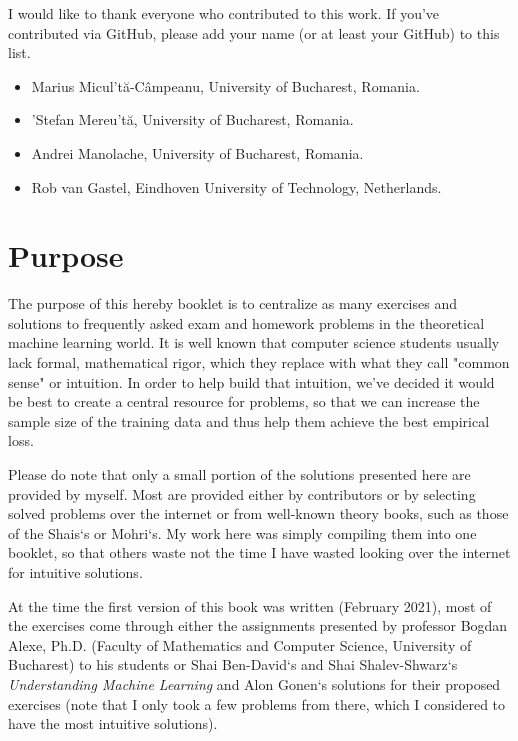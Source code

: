 \documentclass{article}
\newcommand{\<}{\langle}
\renewcommand{\>}{\rangle}
\theoremstyle{definition}
\begin{document}
I would like to thank everyone who contributed to this work. If you've contributed via GitHub, please add your name (or at least your GitHub) to this list.

\begin{itemize}
    \item[] Marius Micul't\u{a}-C\^{a}mpeanu, University of Bucharest, Romania.
    \item[] 'Stefan Mereu't\u{a}, University of Bucharest, Romania.
    \item[] Andrei Manolache, University of Bucharest, Romania.
    \item[] Rob van Gastel,  Eindhoven University of Technology, Netherlands.
\end{itemize}

\newpage

\section*{Purpose}

The purpose of this hereby booklet is to centralize as many exercises and solutions to frequently asked exam and homework problems in the theoretical machine learning world. 
It is well known that computer science students usually lack formal, mathematical rigor, which they replace with what they call "common sense" or intuition. In order to help build that intuition, we've decided it would be best to create a central resource for problems, so that we can increase the sample size of the training data and thus help them achieve the best empirical loss.

Please do note that only a small portion of the solutions presented here are provided by myself. Most are provided either by contributors or by selecting solved problems over the internet or from well-known theory books, such as those of the Shais`s or Mohri`s. My work here was simply compiling them into one booklet, so that others waste not the time I have wasted looking over the internet for intuitive solutions.

At the time the first version of this book was written (February 2021), most of the exercises come through either the assignments presented by professor Bogdan Alexe, Ph.D. (Faculty of Mathematics and Computer Science, University of Bucharest) to his students or Shai Ben-David`s and Shai Shalev-Shwarz`s \textit{Understanding Machine Learning} and Alon Gonen`s solutions for their proposed exercises (note that I only took a few problems from there, which I considered to have the most intuitive solutions).
\end{document}
